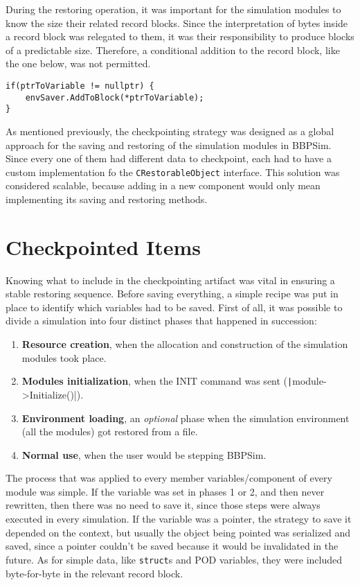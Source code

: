 {During the restoring operation, it was important for the simulation modules to know the size their related record blocks. Since the interpretation of bytes inside a record block was relegated to them, it was their responsibility to produce blocks of a predictable size. Therefore, a conditional addition to the record block, like the one below, was not permitted.
\begin{verbatim}
if(ptrToVariable != nullptr) {
	envSaver.AddToBlock(*ptrToVariable);
}
\end{verbatim}

As mentioned previously, the checkpointing strategy was designed as a global approach for the saving and restoring of the simulation modules in \gls{BBPSim}. Since every one of them had different data to checkpoint, each had to have a custom implementation fo the \texttt{CRestorableObject} interface. This solution was considered scalable, because adding in a new component would only mean implementing its saving and restoring methods.

\section{Checkpointed Items}
Knowing what to include in the checkpointing artifact was vital in ensuring a stable restoring sequence. Before saving everything, a simple recipe was put in place to identify which variables had to be saved. First of all, it was possible to divide a simulation into four distinct phases that happened in succession:
\begin{enumerate}
	\item \textbf{Resource creation}, when the allocation and construction of the simulation modules took place.
	\item \textbf{Modules initialization}, when the INIT command was sent (\texttt|module->Initialize()|).
	\item \textbf{Environment loading}, an \textit{optional} phase when the simulation environment (all the modules) got restored from a file.
	\item \textbf{Normal use}, when the user would be stepping BBPSim. 
\end{enumerate}

The process that was applied to every member variables/component of every module was simple. If the variable was set in phases 1 or 2, and then never rewritten, then there was no need to save it, since those steps were always executed in every simulation. If the variable was a pointer, the strategy to save it depended on the context, but usually the object being pointed was serialized and saved, since a pointer couldn't be saved because it would be invalidated in the future. As for simple data, like \texttt{struct}s and \gls{POD} variables, they were included byte-for-byte in the relevant record block.

}
